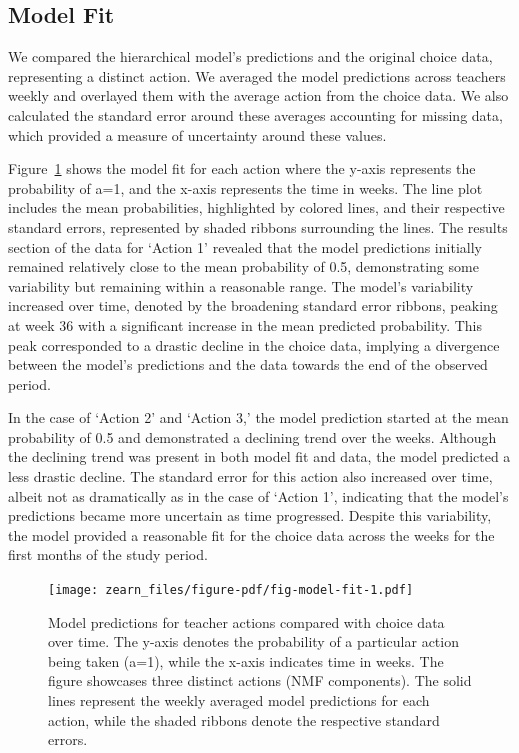 \documentclass[
  number,
  preprint,
  3p,
  onecolumn]{elsarticle}
\begin{document}
\hypertarget{model-fit}{%
\subsection{Model Fit}\label{model-fit}}

We compared the hierarchical model's predictions and the original choice
data, representing a distinct action. We averaged the model predictions
across teachers weekly and overlayed them with the average action from
the choice data. We also calculated the standard error around these
averages accounting for missing data, which provided a measure of
uncertainty around these values.

Figure~\ref{fig-model-fit} shows the model fit for each action where the
y-axis represents the probability of a=1, and the x-axis represents the
time in weeks. The line plot includes the mean probabilities,
highlighted by colored lines, and their respective standard errors,
represented by shaded ribbons surrounding the lines. The results section
of the data for `Action 1' revealed that the model predictions initially
remained relatively close to the mean probability of 0.5, demonstrating
some variability but remaining within a reasonable range. The model's
variability increased over time, denoted by the broadening standard
error ribbons, peaking at week 36 with a significant increase in the
mean predicted probability. This peak corresponded to a drastic decline
in the choice data, implying a divergence between the model's
predictions and the data towards the end of the observed period.

In the case of `Action 2' and `Action 3,' the model prediction started
at the mean probability of 0.5 and demonstrated a declining trend over
the weeks. Although the declining trend was present in both model fit
and data, the model predicted a less drastic decline. The standard error
for this action also increased over time, albeit not as dramatically as
in the case of `Action 1', indicating that the model's predictions
became more uncertain as time progressed. Despite this variability, the
model provided a reasonable fit for the choice data across the weeks for
the first months of the study period.

\begin{figure}

{\centering \texttt{[image: zearn\_files/figure-pdf/fig-model-fit-1.pdf]}

}

\caption{\label{fig-model-fit}Model predictions for teacher actions
compared with choice data over time. The y-axis denotes the probability
of a particular action being taken (a=1), while the x-axis indicates
time in weeks. The figure showcases three distinct actions (NMF
components). The solid lines represent the weekly averaged model
predictions for each action, while the shaded ribbons denote the
respective standard errors.}

\end{figure}
\end{document}

